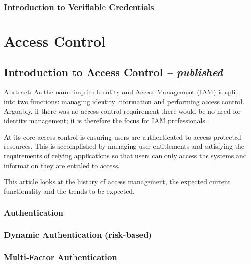\hypertarget{introduction-to-verifiable-credentials}{%
\subsection{Introduction to Verifiable
Credentials}\label{introduction-to-verifiable-credentials}}

\hypertarget{access-control}{%
\chapter{Access Control}\label{access-control}}

\hypertarget{introduction-to-access-control-published}{%
\section{\texorpdfstring{Introduction to Access Control \emph{--
published}}{Introduction to Access Control -- published}}\label{introduction-to-access-control-published}}

Abstract: As the name implies Identity and Access Management (IAM) is
split into two functions: managing identity information and performing
access control. Arguably, if there was no access control requirement
there would be no need for identity management; it is therefore the
focus for IAM professionals.

At its core access control is ensuring users are authenticated to access
protected resources. This is accomplished by managing user entitlements
and satisfying the requirements of relying applications so that users
can only access the systems and information they are entitled to access.

This article looks at the history of access management, the expected
current functionality and the trends to be expected.

\hypertarget{authentication-1}{%
\subsection{Authentication}\label{authentication-1}}

\hypertarget{dynamic-authentication-risk-based}{%
\subsection{Dynamic Authentication
(risk-based)}\label{dynamic-authentication-risk-based}}

\hypertarget{multi-factor-authentication}{%
\subsection{Multi-Factor
Authentication}\label{multi-factor-authentication}}

